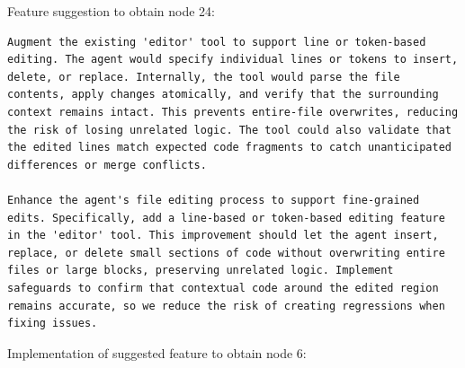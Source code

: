 \documentclass{article}
\begin{document}
Feature suggestion to obtain node 24:

\begin{lstlisting}
Augment the existing 'editor' tool to support line or token-based editing. The agent would specify individual lines or tokens to insert, delete, or replace. Internally, the tool would parse the file contents, apply changes atomically, and verify that the surrounding context remains intact. This prevents entire-file overwrites, reducing the risk of losing unrelated logic. The tool could also validate that the edited lines match expected code fragments to catch unanticipated differences or merge conflicts.

Enhance the agent's file editing process to support fine-grained edits. Specifically, add a line-based or token-based editing feature in the 'editor' tool. This improvement should let the agent insert, replace, or delete small sections of code without overwriting entire files or large blocks, preserving unrelated logic. Implement safeguards to confirm that contextual code around the edited region remains accurate, so we reduce the risk of creating regressions when fixing issues.
\end{lstlisting}


Implementation of suggested feature to obtain node 6:
\end{document}
